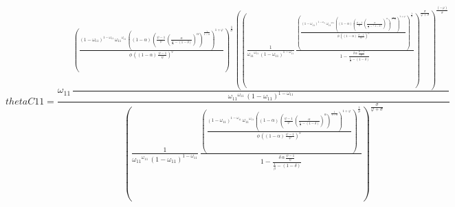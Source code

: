 \begin{dmath*}
thetaC11 = \frac{{{\omega_{11}}}\, \frac{\left(\frac{\left(1-{{\omega_{11}}}\right)^{1-{{\omega_{11}}}}\, {{\omega_{11}}}^{{{\omega_{11}}}}\, \left(\left(1-{{\alpha}}\right)\, \left(\frac{{{\psi}}-1}{{{\psi}}}\, \left(\frac{{{\alpha}}}{\frac{1}{{{\beta}}}-\left(1-{{\delta}}\right)}\right)^{{{\alpha}}}\right)^{\frac{1}{1-{{\alpha}}}}\right)^{1+{{\varphi}}}}{{{\phi}}\, \left(\left(1-{{\alpha}}\right)\, \frac{{{\psi}}-1}{{{\psi}}}\right)^{{{\varphi}}}}\right)^{\frac{1}{{{\sigma}}}}\, \left(\left(\frac{1}{{{\omega_{11}}}^{{{\omega_{11}}}}\, \left(1-{{\omega_{11}}}\right)^{1-{{\omega_{11}}}}}\, \frac{\left(\frac{\left(1-{{\omega_{11}}}\right)^{1-{{\omega_{11}}}}\, {{\omega_{11}}}^{{{\omega_{11}}}}\, \left(\left(1-{{\alpha}}\right)\, \left(\frac{{{\psi}}-1}{{{\psi}}}\, \left(\frac{{{\alpha}}}{\frac{1}{{{\beta}}}-\left(1-{{\delta}}\right)}\right)^{{{\alpha}}}\right)^{\frac{1}{1-{{\alpha}}}}\right)^{1+{{\varphi}}}}{{{\phi}}\, \left(\left(1-{{\alpha}}\right)\, \frac{{{\psi}}-1}{{{\psi}}}\right)^{{{\varphi}}}}\right)^{\frac{1}{{{\sigma}}}}}{1-\frac{{{\delta}}\, {{\alpha}}\, \frac{{{\psi}}-1}{{{\psi}}}}{\frac{1}{{{\beta}}}-\left(1-{{\delta}}\right)}}\right)^{\frac{{{\sigma}}}{{{\varphi}}+{{\sigma}}}}\right)^{\frac{\left(-{{\varphi}}\right)}{{{\sigma}}}}}{{{\omega_{11}}}^{{{\omega_{11}}}}\, \left(1-{{\omega_{11}}}\right)^{1-{{\omega_{11}}}}}}{\left(\frac{1}{{{\omega_{11}}}^{{{\omega_{11}}}}\, \left(1-{{\omega_{11}}}\right)^{1-{{\omega_{11}}}}}\, \frac{\left(\frac{\left(1-{{\omega_{11}}}\right)^{1-{{\omega_{11}}}}\, {{\omega_{11}}}^{{{\omega_{11}}}}\, \left(\left(1-{{\alpha}}\right)\, \left(\frac{{{\psi}}-1}{{{\psi}}}\, \left(\frac{{{\alpha}}}{\frac{1}{{{\beta}}}-\left(1-{{\delta}}\right)}\right)^{{{\alpha}}}\right)^{\frac{1}{1-{{\alpha}}}}\right)^{1+{{\varphi}}}}{{{\phi}}\, \left(\left(1-{{\alpha}}\right)\, \frac{{{\psi}}-1}{{{\psi}}}\right)^{{{\varphi}}}}\right)^{\frac{1}{{{\sigma}}}}}{1-\frac{{{\delta}}\, {{\alpha}}\, \frac{{{\psi}}-1}{{{\psi}}}}{\frac{1}{{{\beta}}}-\left(1-{{\delta}}\right)}}\right)^{\frac{{{\sigma}}}{{{\varphi}}+{{\sigma}}}}}
\end{dmath*}

